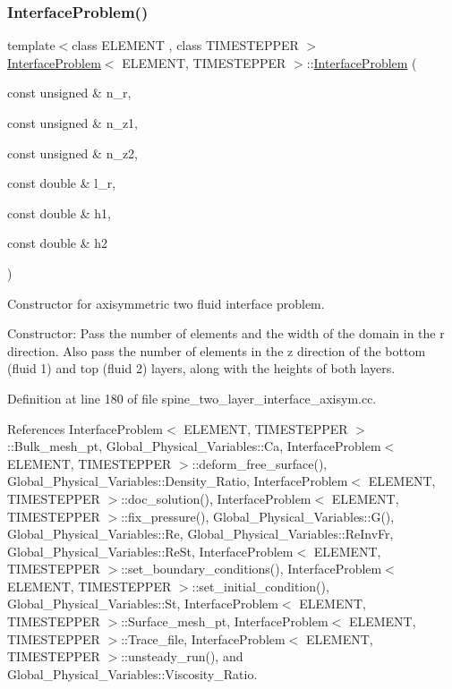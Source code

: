 \subsubsection{\texorpdfstring{Interface\+Problem()}{InterfaceProblem()}\hspace{0.1cm}{\footnotesize\ttfamily [2/2]}}
{\footnotesize\ttfamily template$<$class E\+L\+E\+M\+E\+NT , class T\+I\+M\+E\+S\+T\+E\+P\+P\+ER $>$ \\
\hyperlink{classInterfaceProblem}{Interface\+Problem}$<$ E\+L\+E\+M\+E\+NT, T\+I\+M\+E\+S\+T\+E\+P\+P\+ER $>$\+::\hyperlink{classInterfaceProblem}{Interface\+Problem} (\begin{DoxyParamCaption}\item[{const unsigned \&}]{n\+\_\+r,  }\item[{const unsigned \&}]{n\+\_\+z1,  }\item[{const unsigned \&}]{n\+\_\+z2,  }\item[{const double \&}]{l\+\_\+r,  }\item[{const double \&}]{h1,  }\item[{const double \&}]{h2 }\end{DoxyParamCaption})}



Constructor for axisymmetric two fluid interface problem. 

Constructor\+: Pass the number of elements and the width of the domain in the r direction. Also pass the number of elements in the z direction of the bottom (fluid 1) and top (fluid 2) layers, along with the heights of both layers. 

Definition at line 180 of file spine\+\_\+two\+\_\+layer\+\_\+interface\+\_\+axisym.\+cc.



References Interface\+Problem$<$ E\+L\+E\+M\+E\+N\+T, T\+I\+M\+E\+S\+T\+E\+P\+P\+E\+R $>$\+::\+Bulk\+\_\+mesh\+\_\+pt, Global\+\_\+\+Physical\+\_\+\+Variables\+::\+Ca, Interface\+Problem$<$ E\+L\+E\+M\+E\+N\+T, T\+I\+M\+E\+S\+T\+E\+P\+P\+E\+R $>$\+::deform\+\_\+free\+\_\+surface(), Global\+\_\+\+Physical\+\_\+\+Variables\+::\+Density\+\_\+\+Ratio, Interface\+Problem$<$ E\+L\+E\+M\+E\+N\+T, T\+I\+M\+E\+S\+T\+E\+P\+P\+E\+R $>$\+::doc\+\_\+solution(), Interface\+Problem$<$ E\+L\+E\+M\+E\+N\+T, T\+I\+M\+E\+S\+T\+E\+P\+P\+E\+R $>$\+::fix\+\_\+pressure(), Global\+\_\+\+Physical\+\_\+\+Variables\+::\+G(), Global\+\_\+\+Physical\+\_\+\+Variables\+::\+Re, Global\+\_\+\+Physical\+\_\+\+Variables\+::\+Re\+Inv\+Fr, Global\+\_\+\+Physical\+\_\+\+Variables\+::\+Re\+St, Interface\+Problem$<$ E\+L\+E\+M\+E\+N\+T, T\+I\+M\+E\+S\+T\+E\+P\+P\+E\+R $>$\+::set\+\_\+boundary\+\_\+conditions(), Interface\+Problem$<$ E\+L\+E\+M\+E\+N\+T, T\+I\+M\+E\+S\+T\+E\+P\+P\+E\+R $>$\+::set\+\_\+initial\+\_\+condition(), Global\+\_\+\+Physical\+\_\+\+Variables\+::\+St, Interface\+Problem$<$ E\+L\+E\+M\+E\+N\+T, T\+I\+M\+E\+S\+T\+E\+P\+P\+E\+R $>$\+::\+Surface\+\_\+mesh\+\_\+pt, Interface\+Problem$<$ E\+L\+E\+M\+E\+N\+T, T\+I\+M\+E\+S\+T\+E\+P\+P\+E\+R $>$\+::\+Trace\+\_\+file, Interface\+Problem$<$ E\+L\+E\+M\+E\+N\+T, T\+I\+M\+E\+S\+T\+E\+P\+P\+E\+R $>$\+::unsteady\+\_\+run(), and Global\+\_\+\+Physical\+\_\+\+Variables\+::\+Viscosity\+\_\+\+Ratio.

